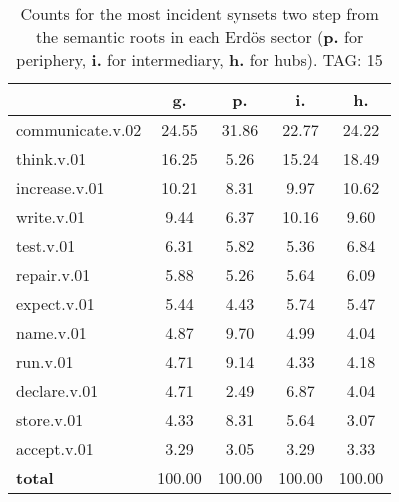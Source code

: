 \begin{table}[h!]
\begin{center}
\begin{tabular}{| l || c | c | c | c |}\hline
 & {\bf g.} & {\bf p.} & {\bf i.} & {\bf h.} \\\hline\hline
communicate.v.02 & 24.55  & 31.86  & 22.77  & 24.22 \\\hline
think.v.01 & 16.25  & 5.26  & 15.24  & 18.49 \\\hline
increase.v.01 & 10.21  & 8.31  & 9.97  & 10.62 \\\hline
write.v.01 & 9.44  & 6.37  & 10.16  & 9.60 \\\hline
test.v.01 & 6.31  & 5.82  & 5.36  & 6.84 \\\hline
repair.v.01 & 5.88  & 5.26  & 5.64  & 6.09 \\\hline
expect.v.01 & 5.44  & 4.43  & 5.74  & 5.47 \\\hline
name.v.01 & 4.87  & 9.70  & 4.99  & 4.04 \\\hline
run.v.01 & 4.71  & 9.14  & 4.33  & 4.18 \\\hline
declare.v.01 & 4.71  & 2.49  & 6.87  & 4.04 \\\hline
store.v.01 & 4.33  & 8.31  & 5.64  & 3.07 \\\hline
accept.v.01 & 3.29  & 3.05  & 3.29  & 3.33 \\\hline\hline
{{\bf total}} & 100.00  & 100.00  & 100.00  & 100.00 \\\hline
\end{tabular}
\caption{Counts for the most incident synsets two step from the semantic roots in each Erd\"os sector ({\bf p.} for periphery, {\bf i.} for intermediary, {\bf h.} for hubs). TAG: 15}
\end{center}
\end{table}